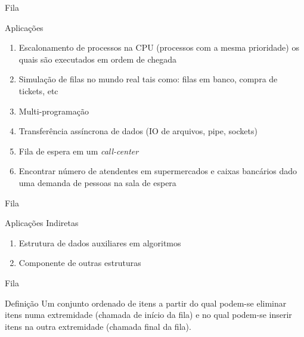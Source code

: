   
\begin{frame}{Fila}
     \begin{block}{Aplicações}

\begin{enumerate}
  \item Escalonamento de processos na CPU (processos com a mesma prioridade)
        os quais são executados em ordem de chegada
  \item Simulação de filas no mundo real tais como: filas em banco, compra de tickets, etc
  
  \item Multi-programação
  \item Transferência assíncrona de dados (IO de arquivos, pipe, sockets)
  \item Fila de espera em um \textit{call-center}      
  \item Encontrar número de atendentes em supermercados e caixas bancários dado uma
  demanda de pessoas na sala de espera
  
\end{enumerate}
     \end{block}          
\end{frame}


  
\begin{frame}{Fila}
     \begin{block}{Aplicações Indiretas}

\begin{enumerate}
  \item Estrutura de dados auxiliares em algoritmos
  \item Componente de outras estruturas
\end{enumerate}
     \end{block}          
\end{frame}

  
\begin{frame}{Fila}
     \begin{block}{Definição}
       Um conjunto ordenado de itens a partir do qual podem-se eliminar 
       itens numa extremidade (chamada de \alert{início} da fila) e
        no qual podem-se inserir itens na outra extremidade 
        (chamada \alert{final} da fila).
     \end{block}          
\end{frame}

